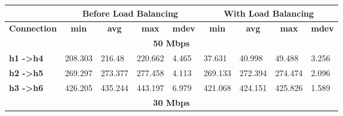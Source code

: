 \begin{table}[h!]
\centering
\begin{tabular}{l|l|l|l|l|l|l|l|l|}
\cline{2-9}
                                                   & \multicolumn{4}{c|}{\textbf{Before Load Balancing}}                                                                                            & \multicolumn{4}{c|}{\textbf{With Load Balancing}}                                                                                              \\ \hline
\multicolumn{1}{|c|}{\textbf{Connection}}          & \multicolumn{1}{c|}{\textbf{min}} & \multicolumn{1}{c|}{\textbf{avg}} & \multicolumn{1}{c|}{\textbf{max}} & \multicolumn{1}{c|}{\textbf{mdev}} & \multicolumn{1}{c|}{\textbf{min}} & \multicolumn{1}{c|}{\textbf{avg}} & \multicolumn{1}{c|}{\textbf{max}} & \multicolumn{1}{c|}{\textbf{mdev}} \\ \hline
\multicolumn{9}{|c|}{\textbf{50 Mbps}}                                                                                                                                                                                                                                                                                                               \\ \hline
\multicolumn{1}{|l|}{\textbf{h1 -\textgreater h4}} & 208.303                           & 216.48                            & 220.662                           & 4.465                              & 37.631                            & 40.998                            & 49.488                            & 3.256                              \\ \hline
\multicolumn{1}{|l|}{\textbf{h2 -\textgreater h5}} & 269.297                           & 273.377                           & 277.458                           & 4.113                              & 269.133                           & 272.394                           & 274.474                           & 2.096                              \\ \hline
\multicolumn{1}{|l|}{\textbf{h3 -\textgreater h6}} & 426.205                           & 435.244                           & 443.197                           & 6.979                              & 421.068                           & 424.151                           & 425.826                           & 1.589                              \\ \hline
\multicolumn{9}{|c|}{\textbf{30 Mbps}}                                                                                                                                                                                                                                                                                                               \\ \hline

\end{tabular}
\end{table}
